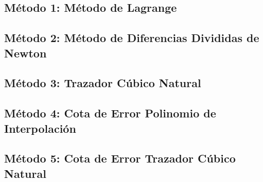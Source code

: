 \documentclass[10pt]{article}
\begin{document}
\subsection{Método 1: Método de Lagrange}
\UseRawInputEncoding


\newpage

\subsection{Método 2: Método de Diferencias Divididas de Newton}
\UseRawInputEncoding


\newpage

\subsection{Método 3: Trazador Cúbico Natural}
\UseRawInputEncoding



\newpage

\subsection{Método 4: Cota de Error Polinomio de Interpolación}


\newpage

\subsection{Método 5: Cota de Error Trazador Cúbico Natural}
\UseRawInputEncoding

\end{document}
